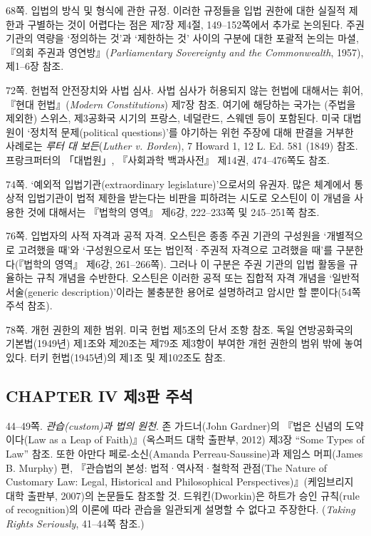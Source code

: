{68쪽. 입법의 방식 및 형식에 관한 규정. 이러한 규정들을 입법 권한에 대한
실질적 제한과 구별하는 것이 어렵다는 점은 제7장 제4절, 149--152쪽에서
추가로 논의된다. 주권 기관의 역량을 `정의하는 것'과 `제한하는 것' 사이의
구분에 대한 포괄적 논의는 마셜, 『의회 주권과
영연방』(\emph{Parliamentary Sovereignty and the Commonwealth}, 1957),
제1--6장 참조.

72쪽. 헌법적 안전장치와 사법 심사. 사법 심사가 허용되지 않는 헌법에
대해서는 휘어, 『현대 헌법』(\emph{Modern Constitutions}) 제7장 참조.
여기에 해당하는 국가는 (주법을 제외한) 스위스, 제3공화국 시기의 프랑스,
네덜란드, 스웨덴 등이 포함된다. 미국 대법원이 `정치적 문제(political
questions)'를 야기하는 위헌 주장에 대해 판결을 거부한 사례로는
\emph{루터 대 보든}(\emph{Luther v. Borden}), 7 Howard 1, 12 L. Ed. 581
(1849) 참조. 프랑크퍼터의 「대법원」, 『사회과학 백과사전』 제14권,
474--476쪽도 참조.

74쪽. `예외적 입법기관(extraordinary legislature)'으로서의 유권자. 많은
체계에서 통상적 입법기관이 법적 제한을 받는다는 비판을 피하려는 시도로
오스틴이 이 개념을 사용한 것에 대해서는 『법학의 영역』 제6강,
222--233쪽 및 245--251쪽 참조.

76쪽. 입법자의 사적 자격과 공적 자격. 오스틴은 종종 주권 기관의 구성원을
`개별적으로 고려했을 때'와 `구성원으로서 또는 법인적·주권적 자격으로
고려했을 때'를 구분한다(『법학의 영역』 제6강, 261--266쪽). 그러나 이
구분은 주권 기관의 입법 활동을 규율하는 규칙 개념을 수반한다. 오스틴은
이러한 공적 또는 집합적 자격 개념을 `일반적 서술(generic
description)'이라는 불충분한 용어로 설명하려고 암시만 할 뿐이다(54쪽
주석 참조).

78쪽. 개헌 권한의 제한 범위. 미국 헌법 제5조의 단서 조항 참조. 독일
연방공화국의 기본법(1949년) 제1조와 제20조는 제79조 제3항이 부여한 개헌
권한의 범위 밖에 놓여 있다. 터키 헌법(1945년)의 제1조 및 제102조도 참조.

\subsection{CHAPTER IV 제3판
주석}\label{chapter-iv-uxc81c3uxd310-uxc8fcuxc11d}

44--49쪽. \emph{관습(custom)과 법의 원천}. 존 가드너(John Gardner)의
『법은 신념의 도약이다(Law as a Leap of Faith)』(옥스퍼드 대학 출판부,
2012) 제3장 ``Some Types of Law'' 참조. 또한 아만다 페로-소신(Amanda
Perreau-Saussine)과 제임스 머피(James B. Murphy) 편, 『관습법의 본성:
법적·역사적·철학적 관점(The Nature of Customary Law: Legal, Historical
and Philosophical Perspectives)』(케임브리지 대학 출판부, 2007)의
논문들도 참조할 것. 드워킨(Dworkin)은 하트가 승인 규칙(rule of
recognition)의 이론에 따라 관습을 일관되게 설명할 수 없다고 주장한다.
(\emph{Taking Rights Seriously}, 41--44쪽 참조.)

}

